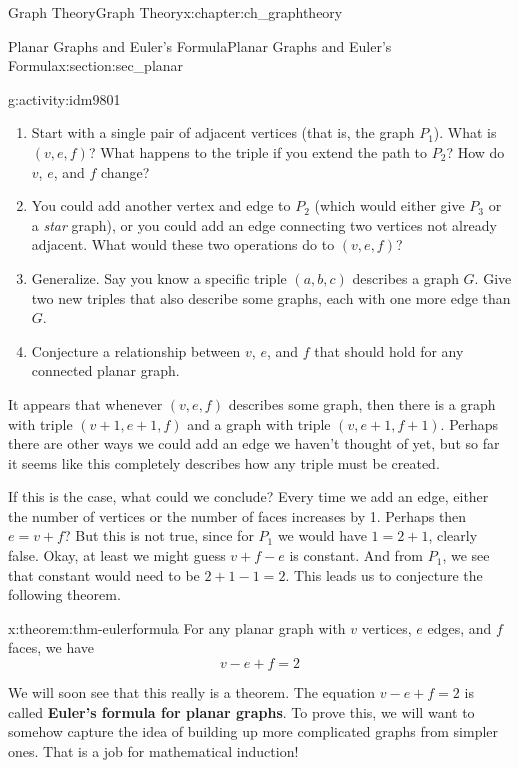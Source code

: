 \documentclass[oneside,10pt,]{book}
\newcommand{\terminology}[1]{\textbf{#1}}
\numberwithin{equation}{chapter}
\begin{document}
\begin{chapterptx}{Graph Theory}{}{Graph Theory}{}{}{x:chapter:ch_graphtheory}
\begin{sectionptx}{Planar Graphs and Euler's Formula}{}{Planar Graphs and Euler's Formula}{}{}{x:section:sec_planar}
\begin{introduction}{}
\begin{activity}{}{g:activity:idm9801}
\begin{enumerate}[font=\bfseries,label=(\alph*),ref=\alph*]
\item{}Start with a single pair of adjacent vertices (that is, the graph \(P_1\)).  What is \((v,e,f)\)?  What happens to the triple if you extend the path to \(P_2\)?  How do \(v\), \(e\), and \(f\) change?%
\item{}You could add another vertex and edge to \(P_2\) (which would either give \(P_3\) or a \emph{star} graph), or you could add an edge connecting two vertices not already adjacent.  What would these two operations do to \((v,e,f)\)?%
\item{}Generalize.  Say you know a specific triple \((a,b,c)\) describes a graph \(G\).  Give two new triples that also describe some graphs, each with one more edge than \(G\).%
\item{}Conjecture a relationship between \(v\), \(e\), and \(f\) that should hold for any connected planar graph.%
\end{enumerate}
\end{activity}
It appears that whenever \((v,e,f)\) describes some graph, then there is a graph with triple \((v+1, e+1, f)\) and a graph with triple \((v,e+1, f+1)\).  Perhaps there are other ways we could add an edge we haven't thought of yet, but so far it seems like this completely describes how any triple must be created.%
\par
If this is the case, what could we conclude?  Every time we add an edge, either the number of vertices or the number of faces increases by 1.  Perhaps then \(e = v + f\)?  But this is not true, since for \(P_1\) we would have \(1 = 2 + 1\), clearly false.  Okay, at least we might guess \(v + f - e\) is constant.  And from \(P_1\), we see that constant would need to be \(2 + 1 - 1 = 2\).  This leads us to conjecture the following theorem.%
\begin{theorem}{}{}{x:theorem:thm-eulerformula}%
For any planar graph with \(v\) vertices, \(e\) edges, and \(f\) faces, we have%
\begin{equation*}
v - e + f = 2
\end{equation*}
%
\end{theorem}
We will soon see that this really is a theorem.  The equation \(v-e+f = 2\) is called \terminology{Euler's formula for planar graphs}.  To prove this, we will want to somehow capture the idea of building up more complicated graphs from simpler ones.  That is a job for mathematical induction!%
\end{introduction}%

\end{sectionptx}
\end{chapterptx}
\end{document}
